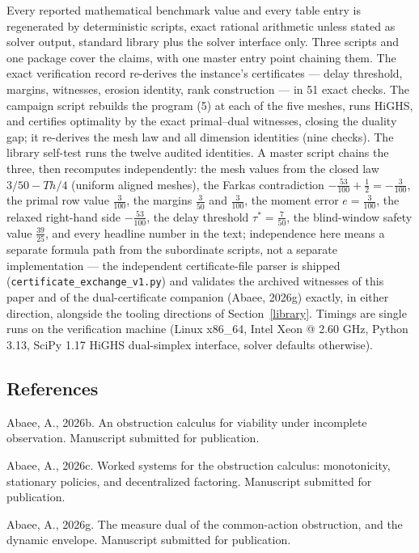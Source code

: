 \documentclass[10pt,twocolumn]{article}
\theoremstyle{plain}
\theoremstyle{definition}
\theoremstyle{remark}
\begin{document}
Every reported mathematical benchmark value and every table entry is
regenerated by deterministic scripts, exact rational arithmetic unless
stated as solver output, standard library plus the solver interface only.
Three scripts and one package cover the claims, with one master entry
point chaining them. The exact
verification record re-derives the instance's certificates --- delay
threshold, margins, witnesses, erosion identity, rank construction ---
in 51 exact checks. The campaign script rebuilds the program (5) at each of
the five meshes, runs HiGHS, and certifies optimality by the exact
primal--dual witnesses, closing the duality gap; it re-derives the mesh law
and all dimension identities (nine checks). The library self-test runs the
twelve audited identities. A master script chains the three, then
recomputes independently: the mesh values from the closed law
\(3/50 - Th/4\) (uniform aligned meshes), the Farkas contradiction
\(-\tfrac{53}{100} + \tfrac12 = -\tfrac{3}{100}\), the primal row value
\(\tfrac{3}{100}\), the margins \(\tfrac{3}{50}\) and \(\tfrac{3}{100}\),
the moment error \(e = \tfrac{3}{100}\), the relaxed right-hand side
\(-\tfrac{53}{100}\), the delay threshold \(\tau^{*} = \tfrac{7}{50}\), the blind-window safety value \(\tfrac{39}{25}\), and every headline
number in the text; independence here means a separate formula path from
the subordinate scripts, not a separate implementation --- the independent
certificate-file parser is shipped (\texttt{certificate\_exchange\_v1.py})
and validates the archived witnesses of this paper and of the
dual-certificate companion (Abaee, 2026g) exactly, in either direction,
alongside the tooling directions of Section~\ref{library}. Timings are single runs on the verification
machine (Linux x86\_64, Intel Xeon @ 2.60 GHz, Python 3.13, SciPy 1.17
HiGHS dual-simplex interface, solver defaults otherwise).

\subsection*{References}

Abaee, A., 2026b. An obstruction calculus for viability under incomplete
observation. Manuscript submitted for publication.

Abaee, A., 2026c. Worked systems for the obstruction calculus:
monotonicity, stationary policies, and decentralized factoring. Manuscript
submitted for publication.

Abaee, A., 2026g. The measure dual of the common-action obstruction, and
the dynamic envelope. Manuscript submitted for publication.
\end{document}
